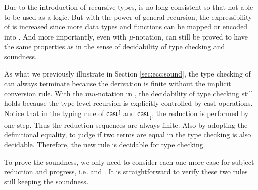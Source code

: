 Due to the introduction of recursive types, \name is no long consistent so that not able to be used as a logic. But with the power of general recursion, the expressibility of \name is increased since more data types and functions can be mapped or encoded into \name. And more importantly, even with $\mu$-notation, \name can still be proved to have the same properties as \name in the sense of decidability of type checking and soundness.

As what we previously illustrate in Section \ref{sec:ecc:sound}, the type checking of \expcc can always terminate because the derivation is finite without the implicit conversion rule. With the $mu$-notation in \name, the decidability of type checking still holds because the type level recursion is explicitly controlled by cast operations. Notice that in the typing rule of $ \mathsf{cast}^{\uparrow} $ and $ \mathsf{cast}_{\downarrow} $, the reduction is performed by one step. Thus the reduction sequences are always finite. Also by adopting the definitional equality, to judge if two terms are equal in the type checking is also decidable. Therefore, the new  rule is decidable for type checking.

To prove the soundness, we only need to consider each one more case for subject reduction and progress, i.e.  and . It is straightforward to verify these two rules still keeping the soundness.
